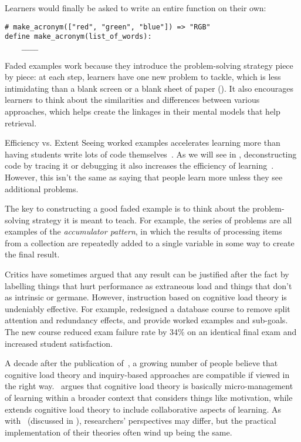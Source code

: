 Learners would finally be asked to write an entire function on their
own:

\begin{verbatim}
# make_acronym(["red", "green", "blue"]) => "RGB"
define make_acronym(list_of_words):
    ____
\end{verbatim}

Faded examples work because they introduce the problem-solving strategy
piece by piece: at each step, learners have one new problem to tackle,
which is less intimidating than a blank screen or a blank sheet of paper
(). It also encourages learners to
think about the similarities and differences between various approaches,
which helps create the linkages in their mental models that help
retrieval.

\begin{aside}{Efficiency vs. Extent}
  Seeing worked examples accelerates learning more than having students
  write lots of code themselves~\cite{Skud2014}. As we will see in
  , deconstructing code by tracing it or debugging it
  also increases the efficiency of learning~\cite{Grif2016}. However,
  this isn't the same as saying that people learn more unless they see
  additional problems.
\end{aside}

The key to constructing a good faded example is to think about the
problem-solving strategy it is meant to teach. For example, the series
of problems are all examples of the \emph{accumulator pattern}, in which the
results of processing items from a collection are repeatedly added to a
single variable in some way to create the final result.

Critics have sometimes argued that any result can be justified after the
fact by labelling things that hurt performance as extraneous load and
things that don't as intrinsic or germane. However, instruction based on
cognitive load theory is undeniably effective. For example,
\cite{Maso2016} redesigned a database course to remove split
attention and redundancy effects, and provide worked examples and
sub-goals. The new course reduced exam failure rate by 34\% on an
identical final exam and increased student satisfaction.

A decade after the publication of~\cite{Kirs2006}, a growing number
of people believe that cognitive load theory and inquiry-based
approaches are compatible if viewed in the right way.~\cite{Kaly2015}
argues that cognitive load theory is basically micro-management of
learning within a broader context that considers things like motivation,
while~\cite{Kirs2018} extends cognitive load theory to include
collaborative aspects of learning. As with~\cite{Mark2018} (discussed
in ), researchers' perspectives may
differ, but the practical implementation of their theories often wind up
being the same.

